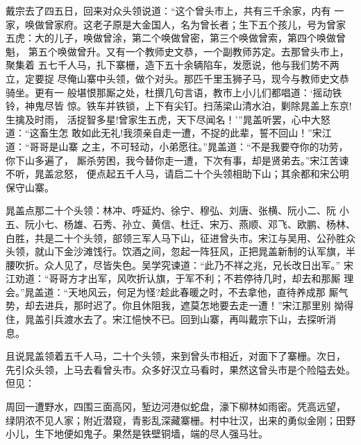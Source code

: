 戴宗去了四五日，回来对众头领说道：“这个曾头市上，共有三千余家，内有
一家，唤做曾家府。这老子原是大金国人，名为曾长者；生下五个孩儿，号为曾家
五虎：大的儿子，唤做曾涂，第二个唤做曾密，第三个唤做曾索，第四个唤做曾魁，
第五个唤做曾升。又有一个教师史文恭，一个副教师苏定。去那曾头市上，聚集着
五七千人马，扎下寨栅，造下五十余辆陷车，发愿说，他与我们势不两立，定要捉
尽俺山寨中头领，做个对头。那匹千里玉狮子马，现今与教师史文恭骑坐。更有一
般堪恨那厮之处，杜撰几句言语，教市上小儿们都唱道：‘摇动铁铃，神鬼尽皆
惊。铁车并铁锁，上下有尖钉。扫荡梁山清水泊，剿除晁盖上东京!生擒及时雨，
活捉智多星!曾家生五虎，天下尽闻名！’”晁盖听罢，心中大怒道：“这畜生怎
敢如此无礼!我须亲自走一遭，不捉的此辈，誓不回山！”宋江道：“哥哥是山寨
之主，不可轻动，小弟愿往。”晁盖道：“不是我要夺你的功劳，你下山多遍了，
厮杀劳困，我今替你走一遭，下次有事，却是贤弟去。”宋江苦谏不听，晁盖忿怒，
便点起五千人马，请启二十个头领相助下山；其余都和宋公明保守山寨。

晁盖点那二十个头领：林冲、呼延灼、徐宁、穆弘、刘唐、张横、阮小二、阮
小五、阮小七、杨雄、石秀、孙立、黄信、杜迁、宋万、燕顺、邓飞、欧鹏、杨林、
白胜，共是二十个头领，部领三军人马下山，征进曾头市。宋江与吴用、公孙胜众
头领，就山下金沙滩饯行。饮酒之间，忽起一阵狂风，正把晁盖新制的认军旗，半
腰吹折。众人见了，尽皆失色。吴学究谏道：“此乃不祥之兆，兄长改日出军。”
宋江劝道：“哥哥方才出军，风吹折认旗，于军不利；不若停待几时，却去和那厮
理会。”晁盖道：“天地风云，何足为怪?趁此春暖之时，不去拿他，直待养成那
厮气势，却去进兵，那时迟了。你且休阻我，遮莫怎地要去走一遭！”宋江那里别
拗得住，晁盖引兵渡水去了。宋江悒怏不已。回到山寨，再叫戴宗下山，去探听消
息。

且说晁盖领着五千人马，二十个头领，来到曾头市相近，对面下了寨栅。次日，
先引众头领，上马去看曾头市。众多好汉立马看时，果然这曾头市是个险隘去处。
但见：

周回一遭野水，四围三面高冈，堑边河港似蛇盘，濠下柳林如雨密。凭高远望，
绿阴浓不见人家；附近潜窥，青影乱深藏寨栅。村中壮汉，出来的勇似金刚；田野
小儿，生下地便如鬼子。果然是铁壁铜墙，端的尽人强马壮。

